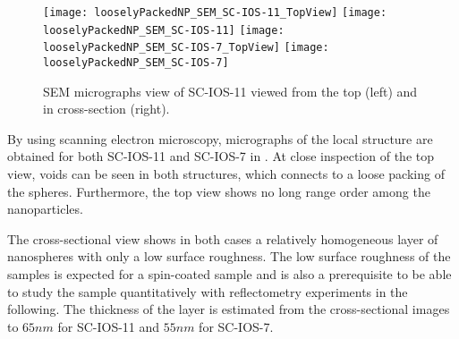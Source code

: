\documentclass[\main/dresen_thesis.tex]{subfiles}
\begin{document}
  \label{sec:looselyPackedNS:layers:sem}
  \begin{figure}[tb]
    \centering
    \texttt{[image: looselyPackedNP\_SEM\_SC-IOS-11\_TopView]}
    \texttt{[image: looselyPackedNP\_SEM\_SC-IOS-11]}
    \texttt{[image: looselyPackedNP\_SEM\_SC-IOS-7\_TopView]}
    \texttt{[image: looselyPackedNP\_SEM\_SC-IOS-7]}
    \caption{\label{fig:looselyPackedNP:nuclearStructure:sem}SEM micrographs view of SC-IOS-11 viewed from the top (left) and in cross-section (right).}
  \end{figure}
  By using scanning electron microscopy, micrographs of the local structure are obtained for both SC-IOS-11  and SC-IOS-7 in .
  At close inspection of the top view, voids can be seen in both structures, which connects to a loose packing of the spheres.
  Furthermore, the top view shows no long range order among the nanoparticles.

  The cross-sectional view shows in both cases a relatively homogeneous layer of nanospheres with only a low surface roughness.
  The low surface roughness of the samples is expected for a spin-coated sample and is also a prerequisite to be able to study the sample quantitatively with reflectometry experiments in the following.
  The thickness of the layer is estimated from the cross-sectional images to $65 \unit{nm}$ for SC-IOS-11 and $55 \unit{nm}$ for SC-IOS-7.


\end{document}
